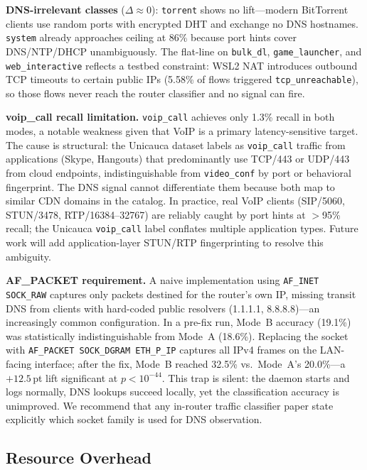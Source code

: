 \documentclass[conference]{IEEEtran}
\begin{document}
\textbf{DNS-irrelevant classes} ($\Delta\approx 0$):
\texttt{torrent} shows no lift---modern BitTorrent clients use random
ports with encrypted DHT and exchange no DNS hostnames.
\texttt{system} already approaches ceiling at 86\% because port hints
cover DNS/NTP/DHCP unambiguously.
The flat-line on \texttt{bulk\_dl}, \texttt{game\_launcher}, and
\texttt{web\_interactive} reflects a testbed constraint: WSL2 NAT
introduces outbound TCP timeouts to certain public IPs (5.58\% of flows
triggered \texttt{tcp\_unreachable}), so those flows never reach the
router classifier and no signal can fire.

\textbf{voip\_call recall limitation.}
\texttt{voip\_call} achieves only 1.3\% recall in both modes, a notable
weakness given that VoIP is a primary latency-sensitive target.
The cause is structural: the Unicauca dataset labels as \texttt{voip\_call}
traffic from applications (Skype, Hangouts) that predominantly use
TCP/443 or UDP/443 from cloud endpoints, indistinguishable from
\texttt{video\_conf} by port or behavioral fingerprint.
The DNS signal cannot differentiate them because both map to similar CDN
domains in the catalog.
In practice, real VoIP clients (SIP/5060, STUN/3478, RTP/16384--32767)
are reliably caught by port hints at $>$95\% recall; the Unicauca
\texttt{voip\_call} label conflates multiple application types.
Future work will add application-layer STUN/RTP fingerprinting to
resolve this ambiguity.

\textbf{AF\_PACKET requirement.}
A naive implementation using \texttt{AF\_INET SOCK\_RAW} captures only
packets destined for the router's own IP, missing transit DNS from
clients with hard-coded public resolvers (1.1.1.1, 8.8.8.8)---an
increasingly common configuration.
In a pre-fix run, Mode~B accuracy (19.1\%) was statistically
indistinguishable from Mode~A (18.6\%).
Replacing the socket with \texttt{AF\_PACKET SOCK\_DGRAM ETH\_P\_IP}
captures all IPv4 frames on the LAN-facing interface;
after the fix, Mode~B reached 32.5\% vs.\ Mode~A's 20.0\%---a
$+12.5$\,pt lift significant at $p < 10^{-44}$.
This trap is silent: the daemon starts and logs normally, DNS lookups
succeed locally, yet the classification accuracy is unimproved.
We recommend that any in-router traffic classifier paper state
explicitly which socket family is used for DNS observation.

\subsection{Resource Overhead}
\label{subsec:resources}
\end{document}
